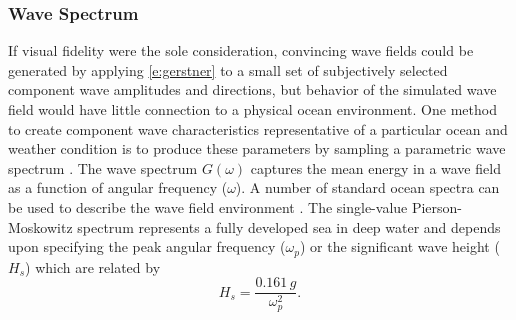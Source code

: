 \documentclass[utf8]{frontiersSCNS} %
\begin{document}
\subsubsection{Wave Spectrum}
If visual fidelity were the sole consideration, convincing wave fields could be generated by applying \eqref{e:gerstner} to a small set of subjectively selected component wave amplitudes and directions, but behavior of the simulated wave field would have little connection to a physical ocean environment. One method to create component wave characteristics representative of a particular ocean and weather condition is to produce these parameters by sampling a parametric wave spectrum \citep{mastin87fourier,thon00ocean,frechot06realistic}. The wave spectrum  $G(\omega)$ captures the mean energy in a wave field as a function of angular frequency ($\omega$). A number of standard ocean spectra can be used to describe the wave field environment \citep{ittc02waves}.
The single-value Pierson-Moskowitz spectrum represents a fully developed sea in deep water and depends upon specifying  the peak angular frequency ($\omega_p$) or the significant wave height ($H_s$) which are related by
\begin{equation}
  H_s = \frac{0.161 \, g}{\omega_p^2}.
  \label{e:pmh}
\end{equation}
\end{document}
